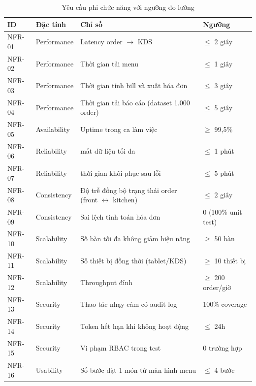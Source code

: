 \begin{table}[htbp]
\centering
\caption{Yêu cầu phi chức năng với ngưỡng đo lường}
\begin{tabular}{|l|l|p{6.5cm}|l|}
\hline
\textbf{ID} & \textbf{Đặc tính} & \textbf{Chỉ số} & \textbf{Ngưỡng} \\
\hline
NFR-01 & Performance & Latency order $\rightarrow$ KDS & $\leq$ 2 giây \\
\hline
NFR-02 & Performance & Thời gian tải menu & $\leq$ 1 giây \\
\hline
NFR-03 & Performance & Thời gian tính bill và xuất hóa đơn & $\leq$ 3 giây \\
\hline
NFR-04 & Performance & Thời gian tải báo cáo \newline (dataset 1.000 order) & $\leq$ 5 giây \\
\hline
NFR-05 & Availability & Uptime trong ca làm việc & $\geq$ 99,5\% \\
\hline
NFR-06 & Reliability & mất dữ liệu tối đa & $\leq$ 1 phút \\
\hline
NFR-07 & Reliability & thời gian khôi phục sau lỗi & $\leq$ 5 phút \\
\hline
NFR-08 & Consistency & Độ trễ đồng bộ trạng thái order \newline (front $\leftrightarrow$ kitchen) & $\leq$ 2 giây \\
\hline
NFR-09 & Consistency & Sai lệch tính toán hóa đơn & 0 \newline (100\% unit test) \\
\hline
NFR-10 & Scalability & Số bàn tối đa không giảm hiệu năng & $\geq$ 50 bàn \\
\hline
NFR-11 & Scalability & Số thiết bị đồng thời \newline (tablet/KDS) & $\geq$ 10 thiết bị \\
\hline
NFR-12 & Scalability & Throughput đỉnh & $\geq$ 200 order/giờ \\
\hline
NFR-13 & Security & Thao tác nhạy cảm có audit log & 100\% coverage \\
\hline
NFR-14 & Security & Token hết hạn khi không hoạt động & $\leq$ 24h \\
\hline
NFR-15 & Security & Vi phạm RBAC trong test & 0 trường hợp \\
\hline
NFR-16 & Usability & Số bước đặt 1 món từ màn hình menu & $\leq$ 4 bước \\
\hline
\end{tabular}
\end{table}
 
